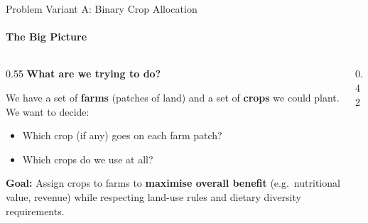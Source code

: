 \documentclass[aspectratio=169,10pt]{beamer}
\begin{document}
\begin{frame}{Problem Variant A: Binary Crop Allocation}
    \framesubtitle{The Big Picture}

    \begin{columns}[T]
        \begin{column}{0.55\textwidth}
            \textbf{What are we trying to do?}
            \vspace{0.3cm}

            We have a set of \textbf{farms} (patches of land) and a set of
            \textbf{crops} we could plant. We want to decide:

            \vspace{0.3cm}
            \begin{itemize}
                \item Which crop (if any) goes on each farm patch?
                \item Which crops do we use at all?
            \end{itemize}

            \vspace{0.4cm}
            \textbf{Goal:} Assign crops to farms to \textbf{maximise overall benefit}
            (e.g.\ nutritional value, revenue) while respecting
            land-use rules and dietary diversity requirements.
        \end{column}
        \begin{column}{0.42\textwidth}
        \end{column}
    \end{columns}
\end{frame}
\end{document}
